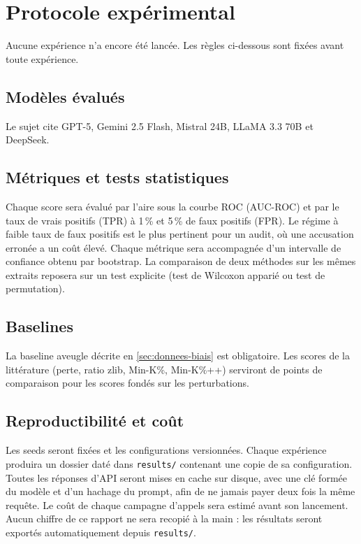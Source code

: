 \section{Protocole expérimental}\label{sec:protocole}
	Aucune expérience n'a encore été lancée. Les règles ci-dessous sont fixées avant toute expérience.

	\subsection{Modèles évalués}\label{sec:protocole-modeles}
		Le sujet cite GPT-5, Gemini 2.5 Flash, Mistral 24B, LLaMA 3.3 70B et DeepSeek.

	\subsection{Métriques et tests statistiques}\label{sec:protocole-metriques}
		Chaque score sera évalué par l'aire sous la courbe ROC (AUC-ROC) et par le taux de vrais positifs (TPR) à 1\,\% et 5\,\% de faux positifs (FPR). Le régime à faible taux de faux positifs est le plus pertinent pour un audit, où une accusation erronée a un coût élevé. Chaque métrique sera accompagnée d'un intervalle de confiance obtenu par bootstrap. La comparaison de deux méthodes sur les mêmes extraits reposera sur un test explicite (test de Wilcoxon apparié ou test de permutation).
	\subsection{Baselines}\label{sec:protocole-baselines}
		La baseline aveugle décrite en \cref{sec:donnees-biais} est obligatoire. Les scores de la littérature (perte, ratio zlib, Min-K\%, Min-K\%++) serviront de points de comparaison pour les scores fondés sur les perturbations.

	\subsection{Reproductibilité et coût}\label{sec:protocole-repro}
		Les seeds seront fixées et les configurations versionnées. Chaque expérience produira un dossier daté dans \texttt{results/} contenant une copie de sa configuration. Toutes les réponses d'API seront mises en cache sur disque, avec une clé formée du modèle et d'un hachage du prompt, afin de ne jamais payer deux fois la même requête. Le coût de chaque campagne d'appels sera estimé avant son lancement. Aucun chiffre de ce rapport ne sera recopié à la main : les résultats seront exportés automatiquement depuis \texttt{results/}.


